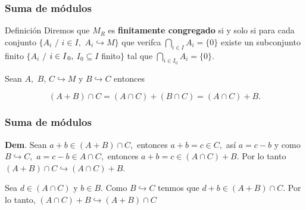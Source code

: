 \documentclass[notes=show]{beamer}%
\newenvironment{Defi}{\begin{block}{Definición}}{\end{block}}
\begin{document}
\begin{frame}%


\bigskip%
\frametitle{Suma de módulos}%


\begin{Defi}
Diremos que $M_{R}$ es \textbf{finitamente congregado }si y solo si para cada
conjunto $\{A_{i}$ $/$ $i\in I,$ $A_{i}\hookrightarrow M\}$ que verifca $%
{\displaystyle\bigcap\limits_{i\in I}}
A_{i}=\{0\}$ existe un subconjunto finito $\{A_{i}$ $/$ $i\in
I_{\text{\thinspace}0},$ $I_{0}\subseteq I$ finito$\}$ tal que $%
{\displaystyle\bigcap\limits_{i\in I_{0}}}
A_{i}=\{0\}.$
\end{Defi}

\begin{lemma}
Sean $A,$ $B$, $C\hookrightarrow M$ y $B\hookrightarrow C$ entonces%

\[
(A+B)\cap C=(A\cap C)+(B\cap C)=(A\cap C)+B\text{.}%
\]

\end{lemma}

\bigskip%

\transboxout
\end{frame}%


\bigskip%

\begin{frame}%


\bigskip%
\frametitle{Suma de módulos}%


\bigskip\textbf{Dem}. Sean $a+b\in(A+B)\cap C,$ entonces $a+b=c\in C,$
así $a=c-b$ y como $B\hookrightarrow C,$ $a=c-b\in A\cap C,$ entonces
$a+b=c\in(A\cap C)+B$. Por lo tanto $(A+B)\cap C\hookrightarrow(A\cap C)+B$.

Sea $d\in(A\cap C)$ y $b\in B.$ Como $B\hookrightarrow C$ tenmos que
$d+b\in(A+B)\cap C.$ Por lo tanto, $(A\cap C)+B\hookrightarrow(A+B)\cap C$

\bigskip

\bigskip%

\transboxout
\end{frame}%
\end{document}
